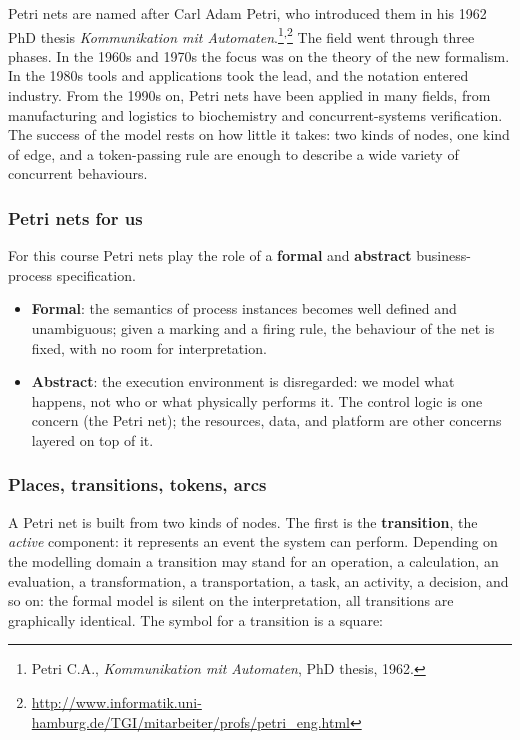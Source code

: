Petri nets are named after Carl Adam Petri, who introduced them in his 1962 PhD thesis \emph{Kommunikation mit Automaten}.\footnote{Petri C.A., \emph{Kommunikation mit Automaten}, PhD thesis, 1962.}\textsuperscript{,}\footnote{\url{http://www.informatik.uni-hamburg.de/TGI/mitarbeiter/profs/petri_eng.html}} The field went through three phases. In the 1960s and 1970s the focus was on the theory of the new formalism. In the 1980s tools and applications took the lead, and the notation entered industry. From the 1990s on, Petri nets have been applied in many fields, from manufacturing and logistics to biochemistry and concurrent-systems verification. The success of the model rests on how little it takes: two kinds of nodes, one kind of edge, and a token-passing rule are enough to describe a wide variety of concurrent behaviours.

\subsubsection{Petri nets for us}

For this course Petri nets play the role of a \textbf{formal} and \textbf{abstract} business-process specification.

\begin{itemize}
  \item \textbf{Formal}: the semantics of process instances becomes well defined and unambiguous; given a marking and a firing rule, the behaviour of the net is fixed, with no room for interpretation.
  \item \textbf{Abstract}: the execution environment is disregarded: we model what happens, not who or what physically performs it. The control logic is one concern (the Petri net); the resources, data, and platform are other concerns layered on top of it.
\end{itemize}

\subsubsection{Places, transitions, tokens, arcs}

A Petri net is built from two kinds of nodes. The first is the \textbf{transition}, the \emph{active} component: it represents an event the system can perform. Depending on the modelling domain a transition may stand for an operation, a calculation, an evaluation, a transformation, a transportation, a task, an activity, a decision, and so on: the formal model is silent on the interpretation, all transitions are graphically identical. The symbol for a transition is a square:


